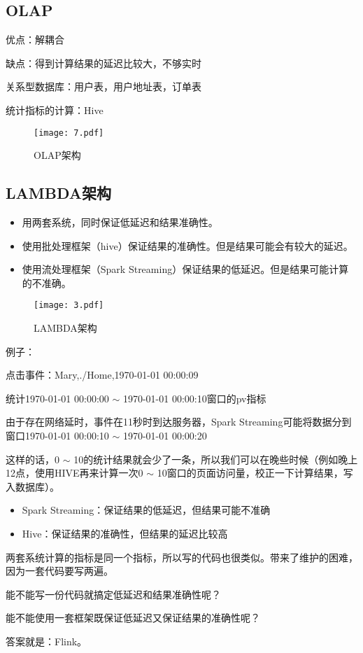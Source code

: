 \documentclass[cn,11pt,chinese]{elegantbook}
\begin{document}
\subsection{OLAP}

优点：解耦合

缺点：得到计算结果的延迟比较大，不够实时

关系型数据库：用户表，用户地址表，订单表

统计指标的计算：Hive

\begin{figure}[htbp]
  \centering
  \texttt{[image: 7.pdf]}
  \caption{OLAP架构}
\end{figure}

\subsection{LAMBDA架构}

\begin{itemize}
  \item 用两套系统，同时保证低延迟和结果准确性。
  \item 使用批处理框架（hive）保证结果的准确性。但是结果可能会有较大的延迟。
  \item 使用流处理框架（Spark Streaming）保证结果的低延迟。但是结果可能计算的不准确。
\end{itemize}

\begin{figure}[htbp]
  \centering
  \texttt{[image: 3.pdf]}
  \caption{LAMBDA架构}
\end{figure}

例子：

\begin{tcolorbox}
  点击事件：Mary,./Home,1970-01-01 00:00:09

  统计1970-01-01 00:00:00 $\sim$ 1970-01-01 00:00:10窗口的pv指标

  由于存在网络延时，事件在11秒时到达服务器，Spark Streaming可能将数据分到窗口1970-01-01 00:00:10 $\sim$ 1970-01-01 00:00:20

  这样的话，0 $\sim$ 10的统计结果就会少了一条，所以我们可以在晚些时候（例如晚上12点，使用HIVE再来计算一次0 $\sim$ 10窗口的页面访问量，校正一下计算结果，写入数据库）。
  \begin{itemize}
    \item Spark Streaming：保证结果的低延迟，但结果可能不准确
    \item Hive：保证结果的准确性，但结果的延迟比较高
  \end{itemize}

  两套系统计算的指标是同一个指标，所以写的代码也很类似。带来了维护的困难，因为一套代码要写两遍。

  能不能写一份代码就搞定低延迟和结果准确性呢？

  能不能使用一套框架既保证低延迟又保证结果的准确性呢？

  答案就是：Flink。

\end{tcolorbox}
\end{document}
